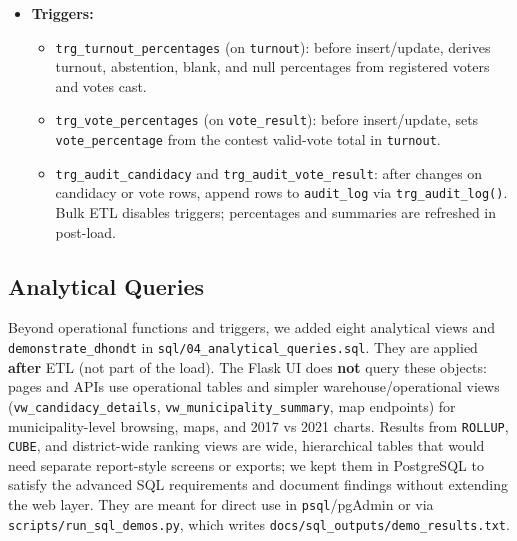 \begin{itemize}
\begin{itemize}
        \item \texttt{vw_stg_potential_duplicates}: A view that identifies potential duplicate records in the staging tables, such as duplicate votes or candidacies.
    \end{itemize}
    \item \textbf{Triggers:}
    \begin{itemize}
        \item \texttt{trg\_turnout\_percentages} (on \texttt{turnout}): before insert/update, derives turnout, abstention, blank, and null percentages from registered voters and votes cast.
        \item \texttt{trg\_vote\_percentages} (on \texttt{vote\_result}): before insert/update, sets \texttt{vote\_percentage} from the contest valid-vote total in \texttt{turnout}.
        \item \texttt{trg\_audit\_candidacy} and \texttt{trg\_audit\_vote\_result}: after changes on candidacy or vote rows, append rows to \texttt{audit\_log} via \texttt{trg\_audit\_log()}. Bulk ETL disables triggers; percentages and summaries are refreshed in post-load.
    \end{itemize}
\end{itemize}
\subsection{Analytical Queries}
Beyond operational functions and triggers, we added eight analytical views and \texttt{demonstrate\_dhondt} in \texttt{sql/04\_analytical\_queries.sql}. They are applied \textbf{after} ETL (not part of the load). The Flask UI does \textbf{not} query these objects: pages and APIs use operational tables and simpler warehouse/operational views (\texttt{vw\_candidacy\_details}, \texttt{vw\_municipality\_summary}, map endpoints) for municipality-level browsing, maps, and 2017 vs 2021 charts. Results from \texttt{ROLLUP}, \texttt{CUBE}, and district-wide ranking views are wide, hierarchical tables that would need separate report-style screens or exports; we kept them in PostgreSQL to satisfy the advanced SQL requirements and document findings without extending the web layer. They are meant for direct use in \texttt{psql}/pgAdmin or via \texttt{scripts/run\_sql\_demos.py}, which writes \texttt{docs/sql\_outputs/demo\_results.txt}.

